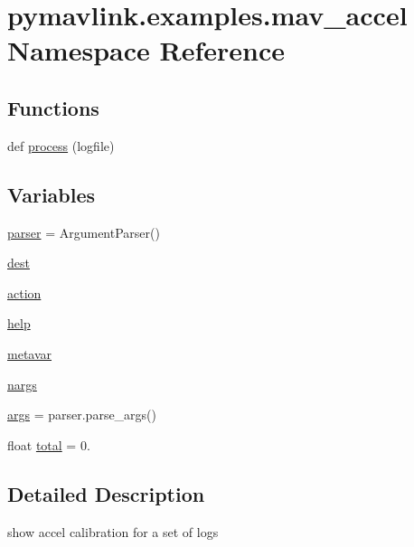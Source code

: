 \hypertarget{namespacepymavlink_1_1examples_1_1mav__accel}{}\section{pymavlink.\+examples.\+mav\+\_\+accel Namespace Reference}
\label{namespacepymavlink_1_1examples_1_1mav__accel}
\subsection*{Functions}
\begin{DoxyCompactItemize}
\item 
def \mbox{\hyperlink{namespacepymavlink_1_1examples_1_1mav__accel_a07d793cb12eb94760b538aa704c189cb}{process}} (logfile)
\end{DoxyCompactItemize}
\subsection*{Variables}
\begin{DoxyCompactItemize}
\item 
\mbox{\hyperlink{namespacepymavlink_1_1examples_1_1mav__accel_ac7f55cd428b0d2655e2b7a0c26681c87}{parser}} = Argument\+Parser()
\item 
\mbox{\hyperlink{namespacepymavlink_1_1examples_1_1mav__accel_a357cf3f2ae5ff9dcd81f017aef010c34}{dest}}
\item 
\mbox{\hyperlink{namespacepymavlink_1_1examples_1_1mav__accel_a8549081c246e62cff385bda66571ebb1}{action}}
\item 
\mbox{\hyperlink{namespacepymavlink_1_1examples_1_1mav__accel_ad61483ef0eae718bad575288f1155111}{help}}
\item 
\mbox{\hyperlink{namespacepymavlink_1_1examples_1_1mav__accel_a4fca8d8f336cfd732f86d0a140d1bd37}{metavar}}
\item 
\mbox{\hyperlink{namespacepymavlink_1_1examples_1_1mav__accel_a10cdf009f829912434de693526228471}{nargs}}
\item 
\mbox{\hyperlink{namespacepymavlink_1_1examples_1_1mav__accel_a4374be8950d5232a486e8d67b634c367}{args}} = parser.\+parse\+\_\+args()
\item 
float \mbox{\hyperlink{namespacepymavlink_1_1examples_1_1mav__accel_aedd60df344a807b8ea3d53d4bb88a246}{total}} = 0.
\end{DoxyCompactItemize}


\subsection{Detailed Description}
\begin{DoxyVerb}show accel calibration for a set of logs
\end{DoxyVerb}
 

